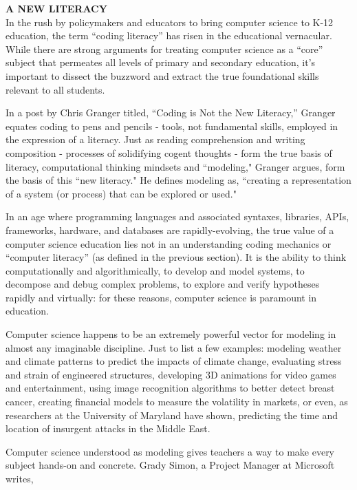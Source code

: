 \textbf{A NEW LITERACY} \\
In the rush by policymakers and educators to bring computer science to K-12 education, the term ``coding literacy'' has risen in the educational vernacular. While there are strong arguments for treating computer science as a ``core'' subject that permeates all levels of primary and secondary education, it's important to dissect the buzzword and extract the true foundational skills relevant to all students. \par
In a post by Chris Granger titled, ``Coding is Not the New Literacy,'' Granger equates coding to pens and pencils - tools, not fundamental skills, employed in the expression of a literacy. Just as reading comprehension and writing composition - processes of solidifying cogent thoughts - form the true basis of literacy, computational thinking mindsets and ``modeling," Granger argues, form the basis of this ``new literacy." He defines modeling as, ``creating a representation of a system (or process) that can be explored or used." \par 
In an age where programming languages and associated syntaxes, libraries, APIs, frameworks, hardware, and databases are rapidly-evolving, the true value of a computer science education lies not in an understanding coding mechanics or ``computer literacy'' (as defined in the previous section). It is the ability to think computationally and algorithmically, to develop and model systems, to decompose and debug complex problems, to explore and verify hypotheses rapidly and virtually: for these reasons, computer science is paramount in education. \par
Computer science happens to be an extremely powerful vector for modeling in almost any imaginable discipline. Just to list a few examples: modeling weather and climate patterns to predict the impacts of climate change, evaluating stress and strain of engineered structures, developing 3D animations for video games and entertainment, using image recognition algorithms to better detect breast cancer, creating financial models to measure the volatility in markets, or even, as researchers at the University of Maryland have shown, predicting the time and location of insurgent attacks in the Middle East\cite{insurgent}. \par
Computer science understood as modeling gives teachers a way to make every subject hands-on and concrete. Grady Simon, a Project Manager at Microsoft writes, 

